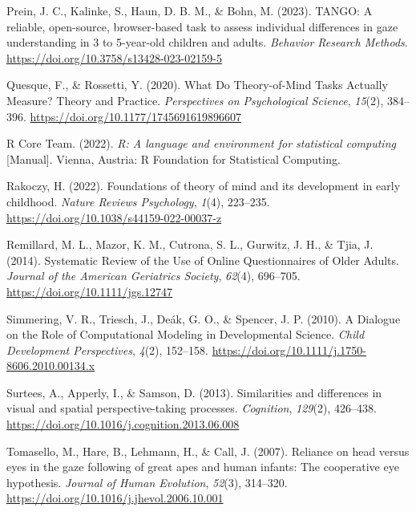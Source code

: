 \documentclass[
  man,mask,floatsintext]{apa6}
\newlength{\cslhangindent}
\newlength{\cslentryspacingunit} %
\newenvironment{CSLReferences}[2] %
 {%
  \setlength{\parindent}{0pt}
  \ifodd #1
  \let\oldpar\par
  \def\par{\hangindent=\cslhangindent\oldpar}
  \fi
  \setlength{\parskip}{#2\cslentryspacingunit}
 }%
 {}
\begin{document}
\begin{CSLReferences}{1}{0}
\leavevmode{}%
Prein, J. C., Kalinke, S., Haun, D. B. M., \& Bohn, M. (2023). {TANGO}: {A} reliable, open-source, browser-based task to assess individual differences in gaze understanding in 3 to 5-year-old children and adults. \emph{Behavior Research Methods}. \url{https://doi.org/10.3758/s13428-023-02159-5}

\leavevmode{}%
Quesque, F., \& Rossetti, Y. (2020). What {Do Theory-of-Mind Tasks Actually Measure}? {Theory} and {Practice}. \emph{Perspectives on Psychological Science}, \emph{15}(2), 384--396. \url{https://doi.org/10.1177/1745691619896607}

\leavevmode{}%
R Core Team. (2022). \emph{R: {A} language and environment for statistical computing} {[}Manual{]}. {Vienna, Austria}: {R Foundation for Statistical Computing}.

\leavevmode{}%
Rakoczy, H. (2022). Foundations of theory of mind and its development in early childhood. \emph{Nature Reviews Psychology}, \emph{1}(4), 223--235. \url{https://doi.org/10.1038/s44159-022-00037-z}

\leavevmode{}%
Remillard, M. L., Mazor, K. M., Cutrona, S. L., Gurwitz, J. H., \& Tjia, J. (2014). Systematic {Review} of the {Use} of {Online Questionnaires} of {Older Adults}. \emph{Journal of the American Geriatrics Society}, \emph{62}(4), 696--705. \url{https://doi.org/10.1111/jgs.12747}

\leavevmode{}%
Simmering, V. R., Triesch, J., Deák, G. O., \& Spencer, J. P. (2010). A {Dialogue} on the {Role} of {Computational Modeling} in {Developmental Science}. \emph{Child Development Perspectives}, \emph{4}(2), 152--158. \url{https://doi.org/10.1111/j.1750-8606.2010.00134.x}

\leavevmode{}%
Surtees, A., Apperly, I., \& Samson, D. (2013). Similarities and differences in visual and spatial perspective-taking processes. \emph{Cognition}, \emph{129}(2), 426--438. \url{https://doi.org/10.1016/j.cognition.2013.06.008}

\leavevmode{}%
Tomasello, M., Hare, B., Lehmann, H., \& Call, J. (2007). Reliance on head versus eyes in the gaze following of great apes and human infants: The cooperative eye hypothesis. \emph{Journal of Human Evolution}, \emph{52}(3), 314--320. \url{https://doi.org/10.1016/j.jhevol.2006.10.001}


\end{CSLReferences}
\end{document}
